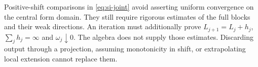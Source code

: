 Positive-shift comparisons in \eqref{eq:si-joint} avoid asserting
uniform convergence on the central form domain. They still require
rigorous estimates of the full blocks and their weak directions.
An iteration must additionally prove
$L_{j+1}=L_j+h_j$, $\sum_jh_j=\infty$ and
$\omega_j\downarrow0$. The algebra does not supply those estimates.
Discarding output through a projection, assuming monotonicity
in shift, or extrapolating local extension cannot replace them.
